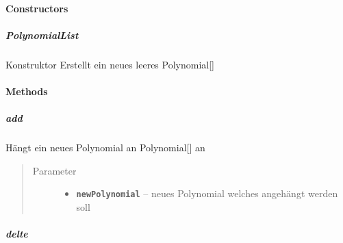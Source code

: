 \documentclass[letterpaper,10pt,ngerman]{sphinxmanual}
\begin{document}
\paragraph{Constructors}
\label{com/linuxluigi/polynomial/PolynomialList:constructors}

\subparagraph{PolynomialList}
\label{com/linuxluigi/polynomial/PolynomialList:id1}

\begin{fulllineitems}
\label{com/linuxluigi/polynomial/PolynomialList:com.linuxluigi.polynomial.PolynomialList.PolynomialList()}
Konstruktor Erstellt ein neues leeres Polynomial{[}{]}

\end{fulllineitems}



\paragraph{Methods}
\label{com/linuxluigi/polynomial/PolynomialList:methods}

\subparagraph{add}
\label{com/linuxluigi/polynomial/PolynomialList:add}

\begin{fulllineitems}
\label{com/linuxluigi/polynomial/PolynomialList:com.linuxluigi.polynomial.PolynomialList.add(Polynomial)}
Hängt ein neues Polynomial an Polynomial{[}{]} an
\begin{quote}\begin{description}
\item[{Parameter}] \leavevmode\begin{itemize}
\item {} 
\textbf{\texttt{newPolynomial}} -- neues Polynomial welches angehängt werden soll

\end{itemize}

\end{description}\end{quote}

\end{fulllineitems}



\subparagraph{delte}
\label{com/linuxluigi/polynomial/PolynomialList:delte}
\end{document}
